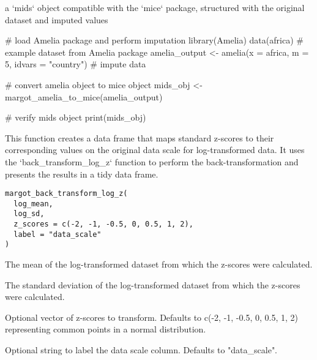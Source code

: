 \documentclass[a4paper]{book}
\begin{document}
%
\begin{Value}
a `mids` object compatible with the `mice` package, structured with the original dataset and imputed values
\end{Value}
%
\begin{Examples}
\begin{ExampleCode}
# load Amelia package and perform imputation
library(Amelia)
data(africa) # example dataset from Amelia package
amelia_output <- amelia(x = africa, m = 5, idvars = "country") # impute data

# convert amelia object to mice object
mids_obj <- margot_amelia_to_mice(amelia_output)

# verify mids object
print(mids_obj)
\end{ExampleCode}
\end{Examples}
%
\begin{Description}
This function creates a data frame that maps standard z-scores to their
corresponding values on the original data scale for log-transformed data.
It uses the `back\_transform\_log\_z` function to perform the back-transformation
and presents the results in a tidy data frame.
\end{Description}
%
\begin{Usage}
\begin{verbatim}
margot_back_transform_log_z(
  log_mean,
  log_sd,
  z_scores = c(-2, -1, -0.5, 0, 0.5, 1, 2),
  label = "data_scale"
)
\end{verbatim}
\end{Usage}
%
\begin{Arguments}
\begin{ldescription}
\item[\code{log\_mean}] The mean of the log-transformed dataset from which the z-scores were calculated.

\item[\code{log\_sd}] The standard deviation of the log-transformed dataset from which the z-scores were calculated.

\item[\code{z\_scores}] Optional vector of z-scores to transform. Defaults to c(-2, -1, -0.5, 0, 0.5, 1, 2)
representing common points in a normal distribution.

\item[\code{label}] Optional string to label the data scale column. Defaults to "data\_scale".
\end{ldescription}
\end{Arguments}
\end{document}
